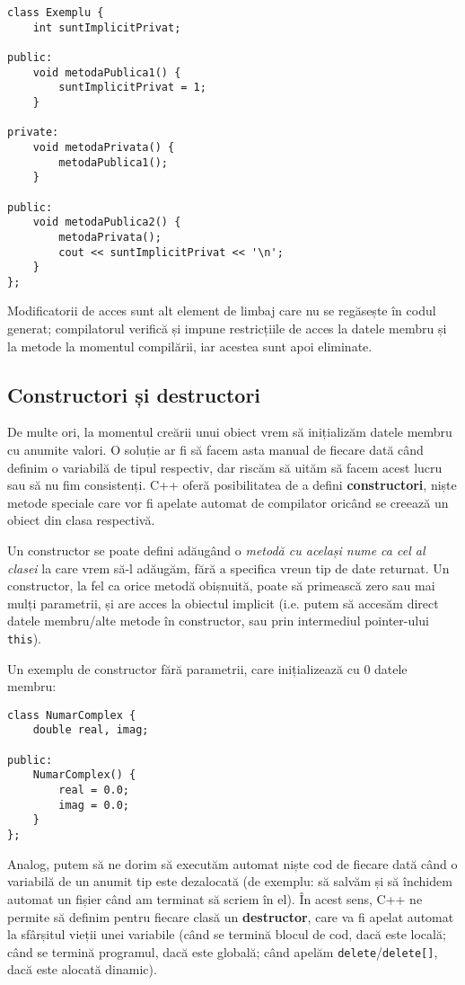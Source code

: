 \begin{lstlisting}
class Exemplu {
    int suntImplicitPrivat;

public:
    void metodaPublica1() {
        suntImplicitPrivat = 1;
    }

private:
    void metodaPrivata() {
        metodaPublica1();
    }

public:
    void metodaPublica2() {
        metodaPrivata();
        cout << suntImplicitPrivat << '\n';
    }
};
\end{lstlisting}

Modificatorii de acces sunt alt element de limbaj care nu se regăsește în codul generat; compilatorul verifică și impune restricțiile de acces la datele membru și la metode la momentul compilării, iar acestea sunt apoi eliminate.

\subsection*{Constructori și destructori}

De multe ori, la momentul creării unui obiect vrem să inițializăm datele membru cu anumite valori. O soluție ar fi să facem asta manual de fiecare dată când definim o variabilă de tipul respectiv, dar riscăm să uităm să facem acest lucru sau să nu fim consistenți. C++ oferă posibilitatea de a defini \textbf{constructori}, niște metode speciale care vor fi apelate automat de compilator oricând se creează un obiect din clasa respectivă.

Un constructor se poate defini adăugând o \emph{metodă cu același nume ca cel al clasei} la care vrem să-l adăugăm, fără a specifica vreun tip de date returnat. Un constructor, la fel ca orice metodă obișnuită, poate să primească zero sau mai mulți parametrii, și are acces la obiectul implicit (i.e. putem să accesăm direct datele membru/alte metode în constructor, sau prin intermediul pointer-ului \texttt{this}).

Un exemplu de constructor fără parametrii, care inițializează cu \(0\) datele membru:
\begin{lstlisting}
class NumarComplex {
    double real, imag;

public:
    NumarComplex() {
        real = 0.0;
        imag = 0.0;
    }
};
\end{lstlisting}

Analog, putem să ne dorim să executăm automat niște cod de fiecare dată când o variabilă de un anumit tip este dezalocată (de exemplu: să salvăm și să închidem automat un fișier când am terminat să scriem în el). În acest sens, C++ ne permite să definim pentru fiecare clasă un \textbf{destructor}, care va fi apelat automat la sfârșitul vieții unei variabile (când se termină blocul de cod, dacă este locală; când se termină programul, dacă este globală; când apelăm \texttt{delete}/\texttt{delete[]}, dacă este alocată dinamic).

